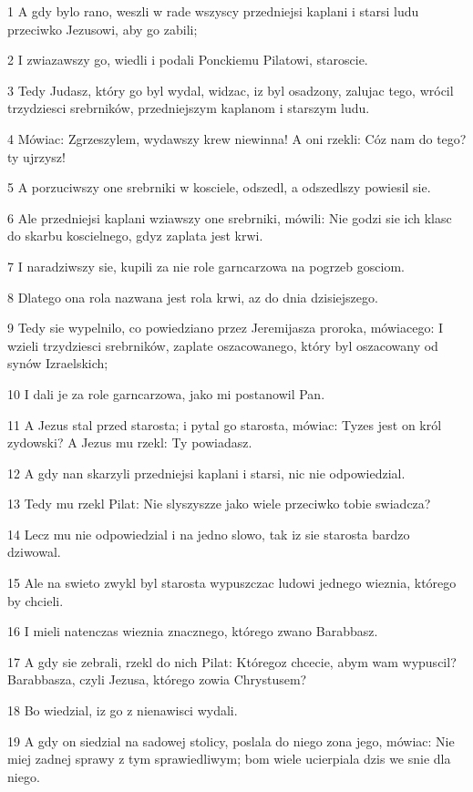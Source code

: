 \par 1 A gdy bylo rano, weszli w rade wszyscy przedniejsi kaplani i starsi ludu przeciwko Jezusowi, aby go zabili;
\par 2 I zwiazawszy go, wiedli i podali Ponckiemu Pilatowi, staroscie.
\par 3 Tedy Judasz, który go byl wydal, widzac, iz byl osadzony, zalujac tego, wrócil trzydziesci srebrników, przedniejszym kaplanom i starszym ludu.
\par 4 Mówiac: Zgrzeszylem, wydawszy krew niewinna! A oni rzekli: Cóz nam do tego? ty ujrzysz!
\par 5 A porzuciwszy one srebrniki w kosciele, odszedl, a odszedlszy powiesil sie.
\par 6 Ale przedniejsi kaplani wziawszy one srebrniki, mówili: Nie godzi sie ich klasc do skarbu koscielnego, gdyz zaplata jest krwi.
\par 7 I naradziwszy sie, kupili za nie role garncarzowa na pogrzeb gosciom.
\par 8 Dlatego ona rola nazwana jest rola krwi, az do dnia dzisiejszego.
\par 9 Tedy sie wypelnilo, co powiedziano przez Jeremijasza proroka, mówiacego: I wzieli trzydziesci srebrników, zaplate oszacowanego, który byl oszacowany od synów Izraelskich;
\par 10 I dali je za role garncarzowa, jako mi postanowil Pan.
\par 11 A Jezus stal przed starosta; i pytal go starosta, mówiac: Tyzes jest on król zydowski? A Jezus mu rzekl: Ty powiadasz.
\par 12 A gdy nan skarzyli przedniejsi kaplani i starsi, nic nie odpowiedzial.
\par 13 Tedy mu rzekl Pilat: Nie slyszyszze jako wiele przeciwko tobie swiadcza?
\par 14 Lecz mu nie odpowiedzial i na jedno slowo, tak iz sie starosta bardzo dziwowal.
\par 15 Ale na swieto zwykl byl starosta wypuszczac ludowi jednego wieznia, którego by chcieli.
\par 16 I mieli natenczas wieznia znacznego, którego zwano Barabbasz.
\par 17 A gdy sie zebrali, rzekl do nich Pilat: Któregoz chcecie, abym wam wypuscil? Barabbasza, czyli Jezusa, którego zowia Chrystusem?
\par 18 Bo wiedzial, iz go z nienawisci wydali.
\par 19 A gdy on siedzial na sadowej stolicy, poslala do niego zona jego, mówiac: Nie miej zadnej sprawy z tym sprawiedliwym; bom wiele ucierpiala dzis we snie dla niego.
